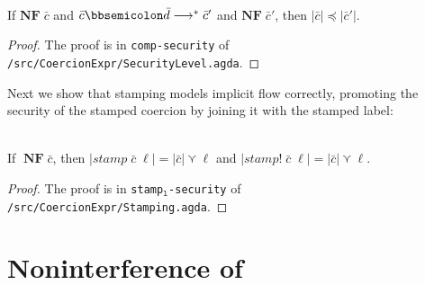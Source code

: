 \begin{lemma}\ \\
  \label{lem:comp-explicit}
  If $\mathbf{NF} \; \bar{c}$
  and $\bar{c} \mdoubleplus \bar{d} \longrightarrow^{*} \bar{c}'$
  and $\mathbf{NF} \; \bar{c}'$,
  then $|\bar{c}| \preccurlyeq |\bar{c}'|$.
\end{lemma}
\begin{proof}
  The proof is in \texttt{comp-security} of \texttt{/src/CoercionExpr/SecurityLevel.agda}.
\end{proof}

Next we show that stamping models implicit flow correctly, promoting
the security of the stamped coercion by joining it with the stamped
label:

\begin{lemma}\ \\
  \label{lem:stamp-implicit}
  If $\;\mathbf{NF}\; \bar{c}$,
  then $| \mathit{stamp} \; \bar{c} \; \ell| = |\bar{c}| \curlyvee \ell$
  and $| \mathit{stamp!} \; \bar{c} \; \ell| = |\bar{c}| \curlyvee \ell$.
\end{lemma}
\begin{proof}
  The proof is in \texttt{stamp$_{\mathtt{l}}$-security} of \texttt{/src/CoercionExpr/Stamping.agda}.
\end{proof}

\section{Noninterference of \DynIFC}
\label{sec:NI-dynifc}

